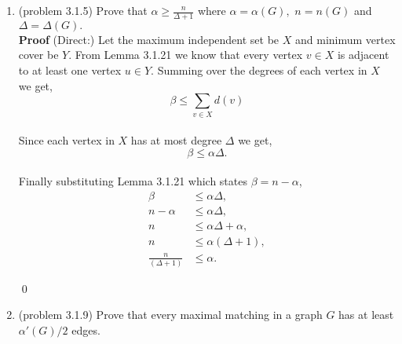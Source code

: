 \documentclass{amsart}
\begin{document}
\begin{enumerate}
$\alpha' = 1$ Consider any $K_{1,n}$. Since every matching can would saturate the the partition with just one vertex, and the matching would contain one edge. \\

$\beta  = 1$ Consider any star graph. Note that for a star graph a central vertex is incident to all edges, therefore the minimum vertex cover in any star graph is size one. \\

$\beta' = 1$ Consider a $K_2$, for a simple graph every edge is incident to exactly two vertices, thus the only way to have an edge cover size one is if the graph is a $K_2$.\\

\qed
\vspace{1.5in}

\item (problem 3.1.5) Prove that $\displaystyle{\alpha \geq \frac{n}{\Delta +1}}$ where $\alpha=\alpha(G),$ $n=n(G)$ and $\Delta=\Delta(G).$\\

\textbf{Proof} (Direct:)   Let the maximum independent set be $X$ and minimum vertex cover be $Y$. From Lemma 3.1.21 we know that every vertex $v \in X$ is adjacent to at least one vertex $u \in Y$. Summing over the degrees of each vertex in $X$ we get,\\
\begin{equation*}
\beta \leq \sum_{v\in X} d(v)
\end{equation*}\\
Since each vertex in $X$ has at most degree $\Delta$ we get,
\begin{equation*}
\beta \leq \alpha \Delta.
\end{equation*}\\
Finally substituting Lemma 3.1.21 which states $\beta = n - \alpha$,
\begin{align*}
\beta &\leq \alpha \Delta,\\
n - \alpha  &\leq \alpha \Delta,\\
n &\leq \alpha \Delta + \alpha,\\
n &\leq \alpha (\Delta + 1),\\
\frac{n}{(\Delta + 1)} &\leq \alpha.
\end{align*}

\qed

\vspace{1.5in}

\item (problem 3.1.9) Prove that every maximal matching in a graph $G$ has at least $\alpha'(G)/2$ edges. \\


\end{enumerate}
\end{document}
